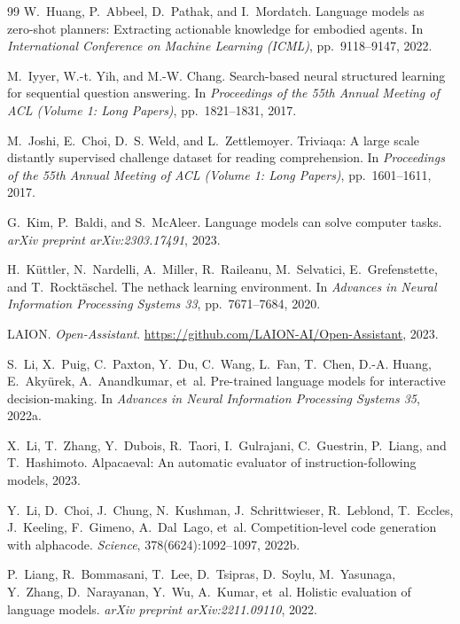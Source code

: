 \begin{thebibliography}{99}
W.~Huang, P.~Abbeel, D.~Pathak, and I.~Mordatch.
\newblock Language models as zero-shot planners: Extracting actionable
knowledge for embodied agents.
\newblock In \emph{International Conference on Machine Learning
(ICML)}, pp.\ 9118--9147, 2022.

M.~Iyyer, W.-t. Yih, and M.-W. Chang.
\newblock Search-based neural structured learning for sequential question
answering.
\newblock In \emph{Proceedings of the 55th Annual Meeting of ACL (Volume 1:
Long Papers)}, pp.\ 1821--1831, 2017.

M.~Joshi, E.~Choi, D.~S. Weld, and L.~Zettlemoyer.
\newblock Triviaqa: A large scale distantly supervised challenge dataset
for reading comprehension.
\newblock In \emph{Proceedings of the 55th Annual Meeting of ACL (Volume 1:
Long Papers)}, pp.\ 1601--1611, 2017.

G.~Kim, P.~Baldi, and S.~McAleer.
\newblock Language models can solve computer tasks.
\newblock \emph{arXiv preprint arXiv:2303.17491}, 2023.

H.~K\"uttler, N.~Nardelli, A.~Miller, R.~Raileanu, M.~Selvatici,
E.~Grefenstette, and T.~Rockt\"aschel.
\newblock The nethack learning environment.
\newblock In \emph{Advances in Neural Information Processing Systems 33},
pp.\ 7671--7684, 2020.

LAION.
\newblock \emph{Open-Assistant}.
\newblock \url{https://github.com/LAION-AI/Open-Assistant}, 2023.

S.~Li, X.~Puig, C.~Paxton, Y.~Du, C.~Wang, L.~Fan, T.~Chen, D.-A. Huang,
E.~Aky\"urek, A.~Anandkumar, et~al.
\newblock Pre-trained language models for interactive decision-making.
\newblock In \emph{Advances in Neural Information Processing Systems 35},
2022a.

X.~Li, T.~Zhang, Y.~Dubois, R.~Taori, I.~Gulrajani, C.~Guestrin, P.~Liang,
and T.~Hashimoto.
\newblock Alpacaeval: An automatic evaluator of instruction-following
models, 2023.

Y.~Li, D.~Choi, J.~Chung, N.~Kushman, J.~Schrittwieser, R.~Leblond,
T.~Eccles, J.~Keeling, F.~Gimeno, A.~Dal~Lago, et~al.
\newblock Competition-level code generation with alphacode.
\newblock \emph{Science}, 378(6624):1092--1097, 2022b.

P.~Liang, R.~Bommasani, T.~Lee, D.~Tsipras, D.~Soylu, M.~Yasunaga,
Y.~Zhang, D.~Narayanan, Y.~Wu, A.~Kumar, et~al.
\newblock Holistic evaluation of language models.
\newblock \emph{arXiv preprint arXiv:2211.09110}, 2022.


\end{thebibliography}
